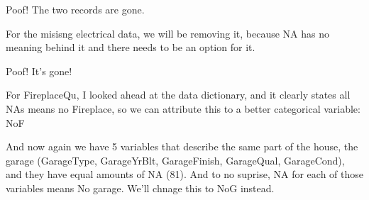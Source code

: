 \documentclass[]{article}
\newenvironment{Shaded}{\begin{snugshade}}{\end{snugshade}}
\newcommand{\KeywordTok}[1]{\textcolor[rgb]{0.13,0.29,0.53}{\textbf{#1}}}
\newcommand{\DecValTok}[1]{\textcolor[rgb]{0.00,0.00,0.81}{#1}}
\newcommand{\StringTok}[1]{\textcolor[rgb]{0.31,0.60,0.02}{#1}}
\newcommand{\ControlFlowTok}[1]{\textcolor[rgb]{0.13,0.29,0.53}{\textbf{#1}}}
\newcommand{\OperatorTok}[1]{\textcolor[rgb]{0.81,0.36,0.00}{\textbf{#1}}}
\newcommand{\NormalTok}[1]{#1}
\begin{document}
Poof! The two records are gone.

For the misisng electrical data, we will be removing it, because NA has
no meaning behind it and there needs to be an option for it.

\begin{Shaded}
\end{Shaded}

Poof! It's gone!

For FireplaceQu, I looked ahead at the data dictionary, and it clearly
states all NAs means no Fireplace, so we can attribute this to a better
categorical variable: NoF

\begin{Shaded}
\end{Shaded}

And now again we have 5 variables that describe the same part of the
house, the garage (GarageType, GarageYrBlt, GarageFinish, GarageQual,
GarageCond), and they have equal amounts of NA (81). And to no suprise,
NA for each of those variables means No garage. We'll chnage this to NoG
instead.
\end{document}

